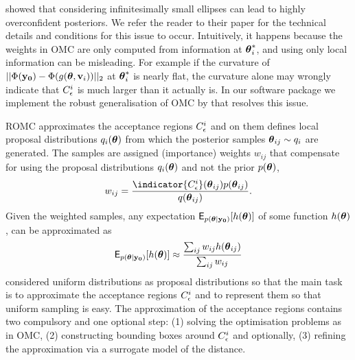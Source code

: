 \citet{Ikonomov2019} showed that considering infinitesimally small
ellipses can lead to highly overconfident posteriors. We refer the
reader to their paper for the technical details and conditions for
this issue to occur. Intuitively, it happens because the weights in
OMC are only computed from information at \(\boldsymbol{\theta}_i^*\), and using
only local information can be misleading. For example if the curvature
of \(||\Phi(\mathbf{y_0})-\Phi(g(\boldsymbol{\theta}, \mathbf{v}_i))||_2\) at
\(\boldsymbol{\theta}_i^*\) is nearly flat, the curvature alone may wrongly
indicate that \(C^i_{\epsilon}\) is much larger than it actually is. In
our software package we implement the robust generalisation of OMC by
\citet{Ikonomov2019} that resolves this issue.

ROMC approximates the acceptance regions \(C^i_{\epsilon}\) and on them defines
local proposal distributions \(q_i(\boldsymbol{\theta})\) from which the
posterior samples \(\boldsymbol{\theta}_{ij} \sim q_i\) are generated. The samples
are assigned (importance) weights \(w_{ij}\) that compensate for using
the proposal distributions \(q_i(\boldsymbol{\theta})\) and not the prior
\(p(\boldsymbol{\theta})\),
\begin{equation}
  w_{ij} = \frac{\indicator{\accregioni}(\thetab_{ij}) p(\thetab_{ij})}{q(\thetab_{ij})}.
  \label{eq:sampling}
\end{equation}
Given the weighted samples, any expectation
\(\mathsf{E}_{p(\boldsymbol{\theta}|\mathbf{y_0})}[h(\boldsymbol{\theta})]\) of some function \(h(\boldsymbol{\theta})\), can be approximated as
\begin{equation} \label{eq:expectation}
  \mathsf{E}_{p(\boldsymbol{\theta}|\mathbf{y_0})}[h(\boldsymbol{\theta})] \approx \frac{\sum_{ij} w_{ij} h(\boldsymbol{\theta}_{ij})}{\sum_{ij} w_{ij}}
\end{equation}
\citet{Ikonomov2019} considered uniform distributions as proposal
distributions so that the main task is to approximate the acceptance
regions \(C^i_{\epsilon}\) and to represent them so that uniform sampling
is easy. The approximation of the acceptance regions contains two
compulsory and one optional step: (1) solving the optimisation
problems as in OMC, (2) constructing bounding boxes around
\(C^i_{\epsilon}\) and optionally, (3) refining the approximation via a
surrogate model of the distance.

